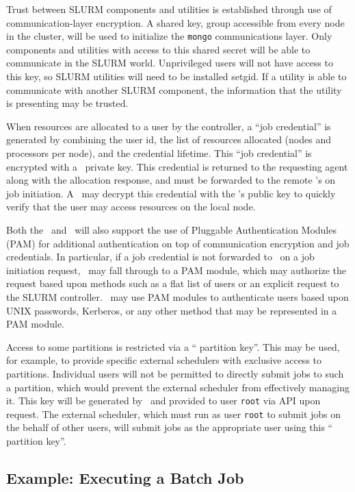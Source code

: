 Trust between SLURM components and utilities is established through use
of communication-layer encryption. A shared key, group accessible from
every node in the cluster, will be used to initialize the {\tt mongo}
communications layer. Only components and utilities with access to this
shared secret will be able to communicate in the SLURM world. Unprivileged
users will not have access to this key, so SLURM utilities will need to be
installed setgid. If a utility is able to communicate with another SLURM
component, the information that the utility is presenting may be trusted.

When resources are allocated to a user by the controller, a ``job 
credential'' is generated by combining the user id, the list of
resources allocated (nodes and processors per node), and the credential
lifetime. This ``job credential'' is encrypted with a \slurmctld\ private key. 
This credential is returned to the requesting agent along with the
allocation response, and must be forwarded to the remote \slurmd 's 
on job initiation. A \slurmd\ may decrypt this credential with the
\slurmctld 's public key to quickly verify that the user may access
resources on the local node. 

Both the \slurmd\ and \slurmctld\ will also support the use
of Pluggable Authentication Modules (PAM) for additional authentication on
top of communication encryption and job credentials. In particular, if a
job credential is not forwarded to \slurmd\ on a job initiation request,
\slurmd\ may fall through to a PAM module, which may authorize the request
based upon methods such as a flat list of users or an explicit request
to the SLURM controller. \slurmctld\ may use PAM modules to authenticate
users based upon UNIX passwords, Kerberos, or any other method that
may be represented in a PAM module.

Access to some partitions is restricted via a `` partition key''.  This may be used,
for example, to provide specific external schedulers with exclusive access
to partitions.  Individual users will not be permitted to directly submit
jobs to such a partition, which would prevent the external scheduler
from effectively managing it.  This key will be generated by \slurmctld\
and provided to user {\tt root} via API upon request.  The external scheduler,
which must run as user {\tt root} to submit jobs on the behalf of other
users, will submit jobs as the appropriate user using this `` partition key''.

\subsection{Example:  Executing a Batch Job}

